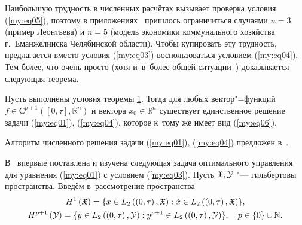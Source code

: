  Наибольшую трудность в численных расчётах вызывает проверка условия (\ref{my:eq05}), поэтому в приложениях~\cite{Br, Bur} пришлось  ограничиться случаями $n=3$ (пример Леонтьева) и $n=5$ (модель экономики коммунального хозяйства г.~Еманжелинска
 Челябинской области). 
 Чтобы купировать эту трудность, предлагается вместо условия (\ref{my:eq03}) воспользоваться условием (\ref{my:eq04}).
 Тем более, что очень просто (хотя и~в~более общей ситуации~\cite[гл.~\,2]{SvirFedP}) доказывается следующая теорема.
\smallskip

 \begin{theorem}[2]Пусть выполнены условия теоремы {\rm \hyperlink{svir:th:1}{1}.} 
 Тогда для любых вектор"=функций  $f\in {\mathbb С}^{p+1} \left(\left[0,\tau\right],{\mathbb R}^{n}\right)$ и вектора  $x_{0} \in {\mathbb R}^{n}$  существует единственное решение задачи {\rm (\ref{my:eq01}), (\ref{my:eq04}),} которое к~тому же имеет вид \rm (\ref{my:eq06}).
 \end{theorem}

\smallskip
 Алгоритм численного решения задачи (\ref{my:eq01}), (\ref{my:eq04}) предложен в~\cite{Kell}.

 В~\cite{svef} впервые поставлена и изучена следующая задача оптимального управления для уравнения (\ref{my:eq01}) с условием (\ref{my:eq03}).
 Пусть ${\mathfrak X}, {\cal Y}$ "--- гильбертовы пространства. Введём в~рассмотрение пространства
\begin{gather*}
H^{1} \left({\mathfrak X}\right) = \{ x \in L_{2} \left( \left(0,\tau\right),{\mathfrak X}\right):
\dot x \in L_{2}\left(\left(0,\tau\right),  {\mathfrak X}\right)\},
\\
H^{p+1} \left({\cal Y}\right) = \{ y \in L_{2} \left( \left(0,\tau\right),{\cal Y}\right):
y^{p+1}\in L_{2}\left(\left(0,\tau\right),{\cal Y}\right)\}, \quad p\in\{0\}\cup{\mathbb N}.
\end{gather*}

